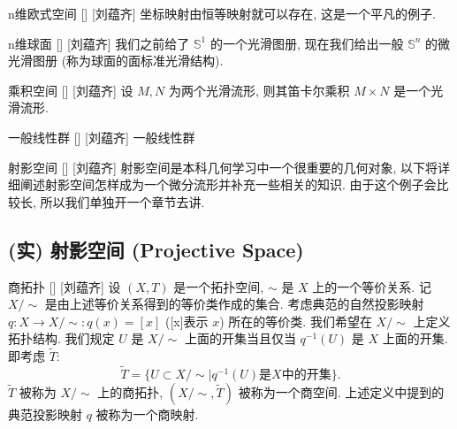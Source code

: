 \documentclass[UTF8]{ctexart}
\begin{document}
        \begin{xmp}
            []
            {n维欧式空间}
            []
            [刘蕴齐]
            坐标映射由恒等映射就可以存在, 这是一个平凡的例子. 
        \end{xmp}
        
        \begin{xmp}
            []
            {n维球面}
            []
            [刘蕴齐]
            我们之前给了 \(\mathbb{S}^1\) 的一个光滑图册, 现在我们给出一般 \(\mathbb{S}^n\) 的微光滑图册 (称为球面的面标准光滑结构). 
        \end{xmp}

        \begin{xmp}
            []
            {乘积空间}
            []
            [刘蕴齐]
            设 \(M,N\) 为两个光滑流形, 则其笛卡尔乘积 \( M\times N\) 是一个光滑流形. 
        \end{xmp}

        \begin{xmp}
            []
            {一般线性群}
            []
            [刘蕴齐]
            一般线性群
        \end{xmp}
        
        \begin{xmp}
            []
            {射影空间}
            []
            [刘蕴齐]
            射影空间是本科几何学习中一个很重要的几何对象, 以下将详细阐述射影空间怎样成为一个微分流形并补充一些相关的知识. 由于这个例子会比较长, 所以我们单独开一个章节去讲. 
        \end{xmp}

    \subsection{(实) 射影空间 (Projective Space)}

        \begin{dfn}
            []
            {商拓扑}
            []
            [刘蕴齐]
            设 \((X,T)\) 是一个拓扑空间,  \(\sim\) 是 \(X\) 上的一个等价关系. 记 \(X / \sim\) 是由上述等价关系得到的等价类作成的集合. 
            考虑典范的自然投影映射 \(q: X \to X/\sim: q(x) = [x]\) ([x]表示 \(x\)) 所在的等价类. 
            我们希望在 \(X / \sim\) 上定义拓扑结构. 我们规定 \(U\) 是 \(X / \sim\) 上面的开集当且仅当 \(q^{-1}(U)\) 是 \(X\) 上面的开集. 即考虑 \(\tilde{T}\):
            \[
                \tilde{T} = \{ U \subset X/\sim | q^{-1}(U) \text{是} X \text{中的开集} \}.
            \]
             \(\tilde{T}\) 被称为 \(X/\sim\) 上的商拓扑,  \((X/\sim,\tilde{T})\) 被称为一个商空间. 上述定义中提到的典范投影映射 \(q\) 被称为一个商映射. 
        \end{dfn}
\end{document}
